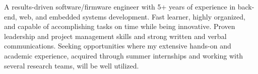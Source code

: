 \cvsummary
{
  A results-driven software/firmware engineer with 5+ years of experience in back-end, web, and embedded systems development. Fast learner, highly organized, and capable of accomplishing tasks on time while being innovative. Proven leadership and project management skills and strong written and verbal communications. Seeking opportunities where my extensive hands-on and academic experience, acquired through summer internships and working with several research teams, will be well utilized.
} 